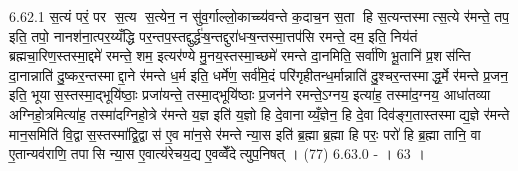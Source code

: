 6.62.1
स॒त्यं परं॒ पर स॒त्य स॒त्येन॒ न सु॑व॒र्गाल्लो॒काच्च्य॑वन्ते क॒दाच॒न स॒ता हि स॒त्यन्तस्मात्स॒त्ये र॑मन्ते॒ तप॒ इति॒ तपो॒ नानश॑ना॒त्पर॒य्यँद्धि पर॒न्तप॒स्तद्दुर्द्ध॑ऱ्ष॒न्तद्दुरा॑धऱ्ष॒न्तस्मा॒त्तप॑सि रमन्ते॒ दम॒ इति॒ निय॑तं ब्रह्मचा॒रिण॒स्तस्मा॒द्दमे॑ रमन्ते॒ शम॒ इत्यर॑ण्ये मु॒नय॒स्तस्मा॒च्छमे॑ रमन्ते दा॒नमिति॒ सर्वा॑णि भू॒तानि॑ प्र॒शस॑न्ति दा॒नान्नाति॑ दु॒ष्कर॒न्तस्माद्दा॒ने र॑मन्ते ध॒र्म इति॒ धर्मे॑ण॒ सर्व॑मि॒दं परि॑गृहीतन्ध॒र्मान्नाति॑ दु॒श्चर॒न्तस्माद्ध॒र्मे र॑मन्ते प्र॒जन॒ इति॒ भूयास॒स्तस्मा॒द्भूयि॑ष्ठाः॒ प्रजा॑यन्ते॒ तस्मा॒द्भूयि॑ष्ठाः प्र॒जन॑ने रमन्ते॒ऽग्नय॒ इत्या॑ह॒ तस्मा॑द॒ग्नय॒ आधा॑तव्या अग्निहो॒त्रमित्या॑ह॒ तस्मा॑दग्निहो॒त्रे र॑मन्ते य॒ज्ञ इति॑ य॒ज्ञो हि दे॒वानाय्यँ॒ज्ञेन॒ हि दे॒वा दिव॑ङ्ग॒तास्तस्माद्य॒ज्ञे र॑मन्ते मान॒समिति॑ वि॒द्वास॒स्तस्मा॑द्वि॒द्वास॑ ए॒व मा॑न॒से र॑मन्ते न्या॒स इति॑ ब्र॒ह्मा ब्र॒ह्मा हि परः॒ परो॑ हि ब्र॒ह्मा तानि॒ वा ए॒तान्यव॑राणि॒ तपासि न्या॒स ए॒वात्य॑रेचय॒द्य ए॒वव्वेँदेत्युप॒निषत् । (77)
6.63.0
- । 63 ।
\anuvakamend

